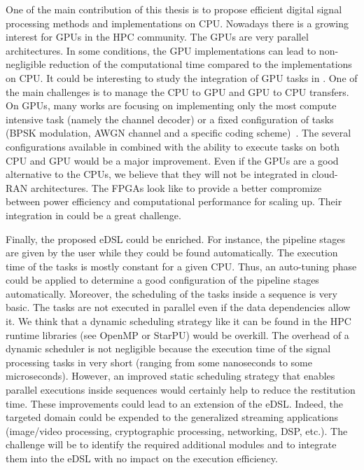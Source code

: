 One of the main contribution of this thesis is to propose efficient digital
signal processing methods and implementations on CPU. Nowadays there is a
growing interest for GPUs in the HPC community. The GPUs are very parallel
architectures. In some conditions, the GPU implementations can lead to
non-negligible reduction of the computational time compared to the
implementations on CPU. It could be interesting to study the integration of
GPU tasks in \AFFECT. One of the main challenges is to manage the CPU to GPU and
GPU to CPU transfers. On GPUs, many works are focusing on implementing only the
most compute intensive task (namely the channel decoder) or a fixed
configuration of tasks (BPSK modulation, AWGN channel and a specific coding
scheme)~\cite{Wu2011,Xianjun2013,LeGal2014a,Lai2016,Giard2016b,Keskin2017b}. The
several configurations available in \AFFECT combined with the ability to execute
tasks on both CPU and GPU would be a major improvement. Even if the GPUs are a
good alternative to the CPUs, we believe that they will not be integrated in
cloud-RAN architectures. The FPGAs look like to provide a better compromize
between power efficiency and computational performance for scaling up. Their
integration in \AFFECT could be a great challenge.

Finally, the proposed eDSL could be enriched. For instance, the pipeline stages
are given by the user while they could be found automatically. The execution
time of the tasks is mostly constant for a given CPU. Thus, an auto-tuning phase
could be applied to determine a good configuration of the pipeline stages
automatically. Moreover, the scheduling of the tasks inside a sequence is very
basic. The tasks are not executed in parallel even if the data dependencies
allow it. We think that a dynamic scheduling strategy like it can be found in
the HPC runtime libraries (see OpenMP or StarPU) would be overkill. The overhead
of a dynamic scheduler is not negligible because the execution time of the
signal processing tasks in very short (ranging from some nanoseconds to some
microseconds). However, an improved static scheduling strategy that enables
parallel executions inside sequences would certainly help to reduce the
restitution time. These improvements could lead to an extension of the \AFFECT
eDSL. Indeed, the targeted domain could be expended to the generalized streaming
applications (image/video processing, cryptographic processing, networking, DSP,
etc.). The challenge will be to identify the required additional modules and to
integrate them into the eDSL with no impact on the execution efficiency.
